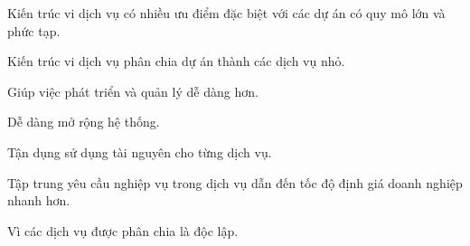 










Kiến trúc vi dịch vụ có nhiều ưu điểm đặc biệt với các dự án có quy mô lớn và phức tạp.

Kiến trúc vi dịch vụ phân chia dự án thành các dịch vụ nhỏ.

Giúp việc phát triển và quản lý dễ dàng hơn.

Dễ dàng mở rộng hệ thống.

Tận dụng sử dụng tài nguyên cho từng dịch vụ.

Tập trung yêu cầu nghiệp vụ trong dịch vụ dẫn đến tốc độ định giá doanh nghiệp nhanh hơn.

Vì các dịch vụ được phân chia là độc lập.


